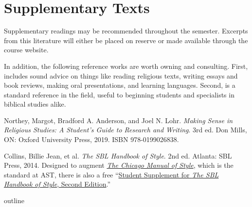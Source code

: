 \documentclass[titlepage]{article}
\begin{document}
\section{Supplementary Texts}
\label{supplementary}

Supplementary readings may be recommended throughout the semester.
Excerpts from this literature will either be placed on reserve or made
available through the course website.

In addition, the following reference works are worth owning and
consulting. First, \cite{rlgs} includes sound advice on things like
reading religious texts, writing essays and book reviews, making oral
presentations, and learning languages. Second, \cite{sbl2} is a standard
reference in the field, useful to beginning students and specialists in
biblical studies alike.

\begingroup
\renewcommand{\section}[2]{}%
\begin{thebibliography}{9}%

	 Northey, Margot, Bradford A. Anderson, and Joel N. Lohr.
	\emph{Making Sense in Religious Studies: A Student's Guide to Research and Writing}.
	3rd ed. Don Mills, ON: Oxford University Press, 2019. ISBN 978-0199026838.

	 Collins, Billie Jean, et al.
	\emph{The SBL Handbook of Style}.
	2nd ed. Atlanta: SBL Press, 2014. %
	Designed to augment \href{http://www.chicagomanualofstyle.org/home.html}{\emph{The Chicago Manual of Style}},
	which is the standard at AST, there is also a free
	“\href{https://www.sbl-site.org/assets/pdfs/pubs/SBLHSsupp2015-02.pdf}{Student Supplement for \emph{The SBL Handbook of Style}, Second Edition}.”

\end{thebibliography}
\endgroup

\section{Course Outline}
\label{outline}

\newcommand\bsc[1]{\cite[#1]{childs}}
\newcommand\bds[1]{\cite[#1]{sommer}}
\newcommand\gvr[1]{\cite[#1]{vonrad}}
\newcommand\nys[1]{\cite[#1]{nyssa}}
\end{document}
